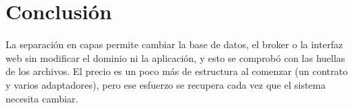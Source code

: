 \documentclass[10.5pt]{article}
\begin{document}
\section{Conclusión}
La separación en capas permite cambiar la base de datos, el broker o la interfaz web sin
modificar el dominio ni la aplicación, y esto se comprobó con las huellas de los archivos. El
precio es un poco más de estructura al comenzar (un contrato y varios adaptadores), pero ese
esfuerzo se recupera cada vez que el sistema necesita cambiar.
\end{document}
